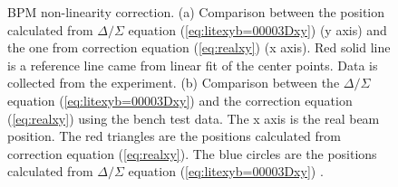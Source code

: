 \documentclass[english,review,number,sort&compress]{elsarticle}
\begin{document}
\begin{figure}
\begin{centering}
\par\end{centering}

\protect\caption{\label{fig:BPM-non-linearity-correction}BPM non-linearity correction. (a) Comparison between the position calculated from $\Delta/\Sigma$ equation (\ref{eq:litexyb=00003Dxy}) (y axis) and the one from correction equation (\ref{eq:realxy}) (x axis). Red solid line is a reference line came from linear fit of the center points. Data is collected from the experiment. (b) Comparison between the $\Delta/\Sigma$ equation (\ref{eq:litexyb=00003Dxy}) and the correction equation (\ref{eq:realxy}) using the bench test data. The x axis is the real beam position. The red triangles are the positions calculated from correction equation (\ref{eq:realxy}). The blue circles are the positions calculated from $\Delta/\Sigma$ equation (\ref{eq:litexyb=00003Dxy}) .}
\end{figure}
\end{document}
